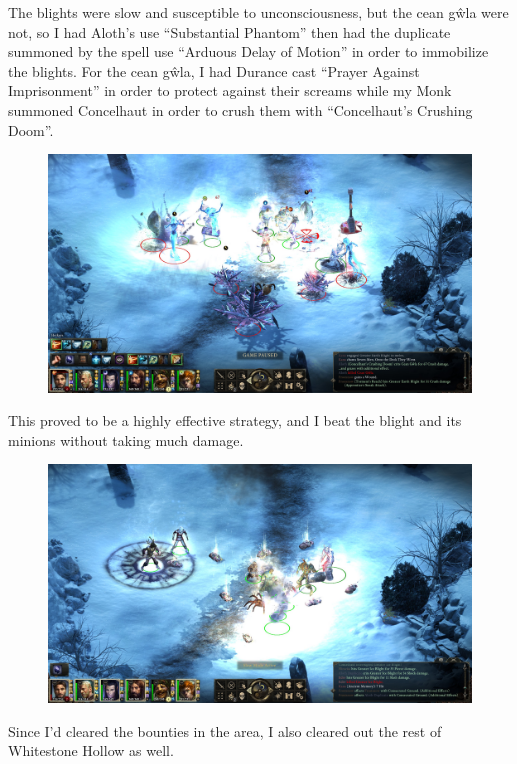 \documentclass{article}
\begin{document}
The blights were slow and susceptible to unconsciousness, but the cean g\^{w}la were not, so I had Aloth's use ``Substantial Phantom'' then had the duplicate summoned by the spell use ``Arduous Delay of Motion'' in order to immobilize the blights.  For the cean g\^{w}la, I had Durance cast ``Prayer Against Imprisonment'' in order to protect against their screams while my Monk summoned Concelhaut in order to crush them with ``Concelhaut's Crushing Doom''.

\begin{figure}
\includegraphics[scale=0.33]{files/blog/2020_01_18_poe_potd_wmpt2/2020_01_18_bounty2_2.jpg}
\end{figure}

This proved to be a highly effective strategy, and I beat the blight and its minions without taking much damage.

\begin{figure}
\includegraphics[scale=0.33]{files/blog/2020_01_18_poe_potd_wmpt2/2020_01_18_bounty2_3.jpg}
\end{figure}

Since I'd cleared the bounties in the area, I also cleared out the rest of Whitestone Hollow as well.
\end{document}

